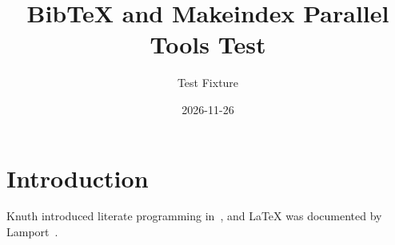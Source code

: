 \documentclass{article}
\title{BibTeX and Makeindex Parallel Tools Test}
\author{Test Fixture}
\date{2026-11-26}
\begin{document}
\maketitle

\section{Introduction}
Knuth introduced literate programming in~\cite{knuth1984literate},
and \LaTeX{} was documented by Lamport~\cite{lamport1994latex}.




\printindex
\end{document}
